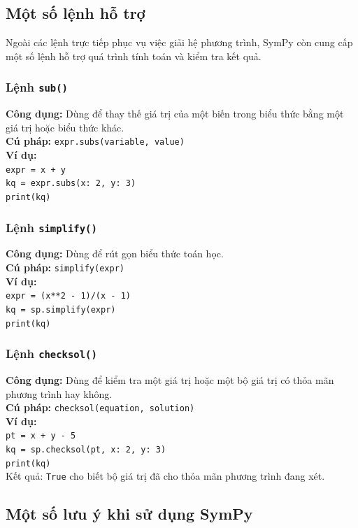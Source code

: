 \documentclass[13pt,a4paper]{article}
\begin{document}
\subsection{Một số lệnh hỗ trợ}
Ngoài các lệnh trực tiếp phục vụ việc giải hệ phương trình, SymPy còn cung cấp một số lệnh hỗ trợ quá trình tính toán và kiểm tra kết quả.
\subsubsection{Lệnh \texttt{sub()}}
\textbf{Công dụng: }Dùng để thay thế giá trị của một biến trong biểu thức bằng một giá trị hoặc biểu thức khác.\\
\textbf{Cú pháp:} \texttt{expr.subs(variable, value)}\\
\textbf{Ví dụ: }\\
\texttt{expr = x + y\\
kq = expr.subs({x: 2, y: 3})\\
print(kq)}
\subsubsection{Lệnh \texttt{simplify()}}
\textbf{Công dụng: }Dùng để rút gọn biểu thức toán học.\\
\textbf{Cú pháp:} \texttt{simplify(expr)}\\
\textbf{Ví dụ: }\\
\texttt{expr = (x**2 - 1)/(x - 1)\\
kq = sp.simplify(expr)\\
print(kq)}
\subsubsection{Lệnh \texttt{checksol()}}
\textbf{Công dụng:} Dùng để kiểm tra một giá trị hoặc một bộ giá trị có thỏa mãn phương trình hay không.\\
\textbf{Cú pháp: }\texttt{checksol(equation, solution)}\\
\textbf{Ví dụ:}\\
\texttt{pt = x + y - 5\\
kq = sp.checksol(pt, {x: 2, y: 3})\\
print(kq)}\\
Kết quả: \texttt{True} cho biết bộ giá trị đã cho thỏa mãn phương trình đang xét.
\subsection{Một số lưu ý khi sử dụng SymPy}
\end{document}
